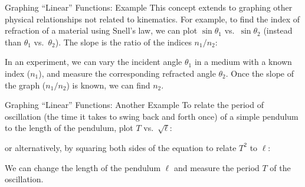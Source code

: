 \documentclass[12pt,compress,aspectratio=169,dvipsnames]{beamer}
\begin{document}
\begin{frame}{Graphing ``Linear'' Functions: Example}
  This concept extends to graphing other physical relationships not related to
  kinematics. For example, to find the index of refraction of a material using
  Snell's law, we can plot $\sin\theta_1$ vs.\ $\sin\theta_2$ (instead than
  $\theta_1$ vs.\ $\theta_2$). The slope is the ratio of the indices $n_1/n_2$:


  In an experiment, we can vary the incident angle $\theta_1$ in a medium with
  a known index ($n_1$), and measure the corresponding refracted angle
  $\theta_2$. Once the slope of the graph ($n_1/n_2$) is known, we can find
  $n_2$.
\end{frame}



\begin{frame}{Graphing ``Linear'' Functions: Another Example}
  To relate the period of oscillation (the time it takes to swing back and
  forth once) of a simple pendulum to the length of the pendulum, plot $T$
  vs.\ $\sqrt\ell$:


  or alternatively, by squaring both sides of the equation to relate $T^2$ to
  $\ell$:


  We can change the length of the pendulum $\ell$ and measure the period $T$ of
  the oscillation.
\end{frame}
\end{document}
